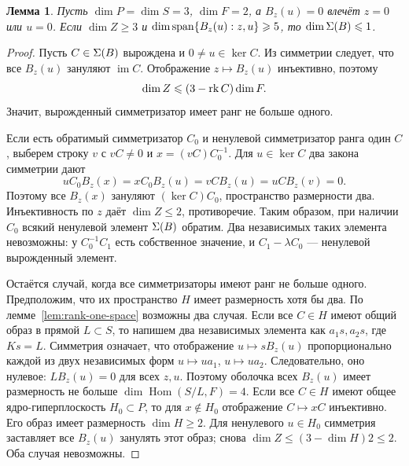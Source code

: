 \documentclass[11pt,a4paper]{article}
\numberwithin{equation}{section}
\theoremstyle{plain}
\newtheorem{lemma}[theorem]{Лемма}
\theoremstyle{definition}
\DeclareMathOperator{\im}{im}\DeclareMathOperator{\supp}{supp}
\DeclareMathOperator{\Hom}{Hom}\DeclareMathOperator{\diag}{diag}
\newcommand{\leqs}{\leqslant}\newcommand{\geqs}{\geqslant}
\begin{document}
\begin{lemma}\label{lem:sym-small}
Пусть $\dim P=\dim S=3$, $\dim F=2$, а $B_z(u)=0$ влечёт
$z=0$ или $u=0$. Если $\dim Z\geqs3$ и
$\dim\Span\{B_z(u):z,u\}\geqs5$, то $\dim\Sig(B)\leqs1$.
\end{lemma}
\begin{proof}
Пусть $C\in\Sigma(B)$ вырождена и $0\ne u\in\ker C$. Из симметрии
следует, что все $B_z(u)$ зануляют $\im C$. Отображение
$z\mapsto B_z(u)$ инъективно, поэтому
\begin{equation}\label{eq:sym-capacity}
 \dim Z\leqs(3-\rk C)\dim F.
\end{equation}
Значит, вырожденный симметризатор имеет ранг не больше одного.

Если есть обратимый симметризатор $C_0$ и ненулевой симметризатор
ранга один $C$, выберем строку $v$ с $vC\ne0$ и
$x=(vC)C_0^{-1}$. Для $u\in\ker C$ два закона симметрии дают
\[
 uC_0B_z(x)=xC_0B_z(u)=vCB_z(u)=uCB_z(v)=0.
\]
Поэтому все $B_z(x)$ зануляют $(\ker C)C_0$, пространство размерности два.
Инъективность по $z$ даёт $\dim Z\leqs2$, противоречие.
Таким образом, при наличии $C_0$ всякий ненулевой элемент $\Sigma(B)$
обратим. Два независимых таких элемента невозможны: у $C_0^{-1}C_1$
есть собственное значение, и $C_1-\lambda C_0$ --- ненулевой
вырожденный элемент.

Остаётся случай, когда все симметризаторы имеют ранг не больше одного.
Предположим, что их пространство $H$ имеет размерность хотя бы два.
По лемме~\ref{lem:rank-one-space} возможны два случая.
Если все $C\in H$ имеют общий образ в прямой $L\subset S$, то
напишем два независимых элемента как $a_1s,a_2s$, где $Ks=L$.
Симметрия означает, что отображение $u\mapsto sB_z(u)$ пропорционально
каждой из двух независимых форм $u\mapsto ua_1$, $u\mapsto ua_2$.
Следовательно, оно нулевое: $LB_z(u)=0$ для всех $z,u$.
Поэтому оболочка всех $B_z(u)$
имеет размерность не больше $\dim\Hom(S/L,F)=4$.
Если все $C\in H$ имеют общее ядро-гиперплоскость $H_0\subset P$,
то для $x\notin H_0$ отображение $C\mapsto xC$ инъективно.
Его образ имеет размерность $\dim H\geqs2$. Для ненулевого
$u\in H_0$ симметрия заставляет все $B_z(u)$ занулять этот образ;
снова $\dim Z\leqs(3-\dim H)2\leqs2$. Оба случая невозможны.
\end{proof}
\end{document}
